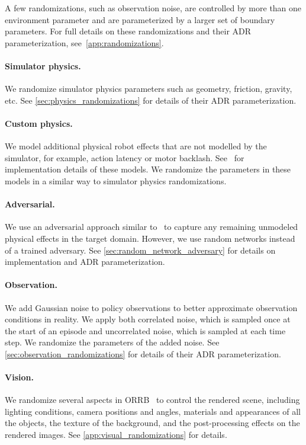 A few randomizations, such as observation noise, are controlled by more than one environment parameter and are parameterized by a larger set of boundary parameters. For full details on these randomizations and their ADR parameterization, see~\autoref{app:randomizations}.

\paragraph{Simulator physics.} We randomize simulator physics parameters such as geometry, friction, gravity, etc. See \autoref{sec:physics_randomizations} for details of their ADR parameterization.

\paragraph{Custom physics.} We model additional physical robot effects that are not modelled by the simulator, for example, action latency or motor backlash. See~\citep[Appendix~C.2]{openai2018learning} for implementation details of these models. We randomize the parameters in these models in a similar way to simulator physics randomizations.

\paragraph{Adversarial.} We use an adversarial approach similar to~\cite{pinto2017supervision, pinto2017robust} to capture any remaining unmodeled physical effects in the target domain. However, we use random networks instead of a trained adversary. See \autoref{sec:random_network_adversary} for details on implementation and ADR parameterization.

\paragraph{Observation.} We add Gaussian noise to policy observations to better approximate observation conditions in reality. We apply both correlated noise, which is sampled once at the start of an episode and uncorrelated noise, which is sampled at each time step. We randomize the parameters of the added noise. See \autoref{sec:observation_randomizations} for details of their ADR parameterization.

\paragraph{Vision.} We randomize several aspects in ORRB~\cite{chociej2019orrb} to control the rendered scene, including lighting conditions, camera positions and angles, materials and appearances of all the objects, the texture of the background, and the post-processing effects on the rendered images. See \autoref{app:visual_randomizations} for details.
